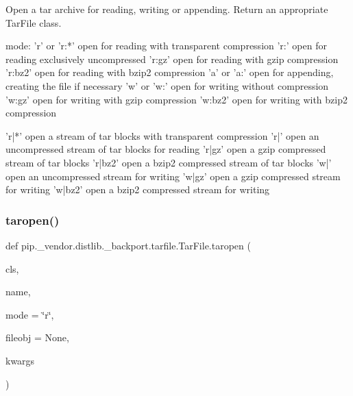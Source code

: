 \begin{DoxyVerb}Open a tar archive for reading, writing or appending. Return
   an appropriate TarFile class.

   mode:
   'r' or 'r:*' open for reading with transparent compression
   'r:'         open for reading exclusively uncompressed
   'r:gz'       open for reading with gzip compression
   'r:bz2'      open for reading with bzip2 compression
   'a' or 'a:'  open for appending, creating the file if necessary
   'w' or 'w:'  open for writing without compression
   'w:gz'       open for writing with gzip compression
   'w:bz2'      open for writing with bzip2 compression

   'r|*'        open a stream of tar blocks with transparent compression
   'r|'         open an uncompressed stream of tar blocks for reading
   'r|gz'       open a gzip compressed stream of tar blocks
   'r|bz2'      open a bzip2 compressed stream of tar blocks
   'w|'         open an uncompressed stream for writing
   'w|gz'       open a gzip compressed stream for writing
   'w|bz2'      open a bzip2 compressed stream for writing
\end{DoxyVerb}
 \mbox{\label{classpip_1_1__vendor_1_1distlib_1_1__backport_1_1tarfile_1_1TarFile_a371e1e882262ee77cbbc6f9d80c863f6}} 
\subsubsection{\texorpdfstring{taropen()}{taropen()}}
{\footnotesize\ttfamily def pip.\+\_\+vendor.\+distlib.\+\_\+backport.\+tarfile.\+Tar\+File.\+taropen (\begin{DoxyParamCaption}\item[{}]{cls,  }\item[{}]{name,  }\item[{}]{mode = {\ttfamily \char`\"{}r\char`\"{}},  }\item[{}]{fileobj = {\ttfamily None},  }\item[{}]{kwargs }\end{DoxyParamCaption})}

